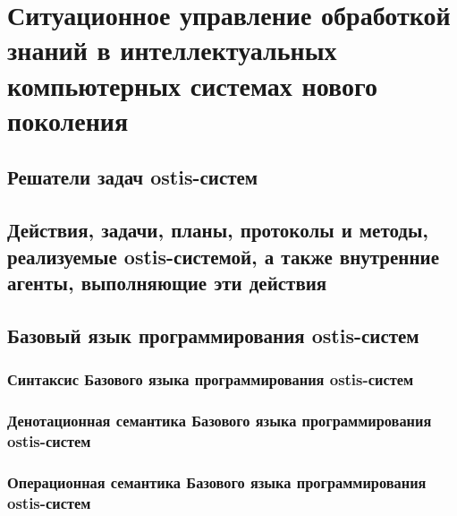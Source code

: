 \chapter{Ситуационное управление обработкой знаний в интеллектуальных компьютерных системах нового поколения}
\label{chapter_situation_management}


\section{Решатели задач ostis-систем}
\section{Действия, задачи, планы, протоколы и методы, реализуемые ostis-системой, а также внутренние агенты, выполняющие эти действия}
\section{Базовый язык программирования ostis-систем}
\subsection{Синтаксис Базового языка программирования ostis-систем}
\subsection{Денотационная семантика Базового языка программирования ostis-систем}
\subsection{Операционная семантика Базового языка программирования ostis-систем}

%